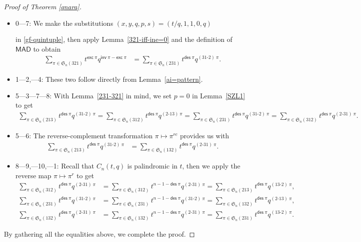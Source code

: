 \documentclass[12pt,reqno]{amsart}
\numberwithin{equation}{section}
\theoremstyle{plain}
\theoremstyle{definition}
\def\S{\mathfrak{S}}
\def\exc{\mathsf{exc}}
\def\des{\mathsf{des}}
\def\inv{\mathsf{inv}}
\def\MAD{\mathsf{MAD}}
\def\cab{31\text{-}2}
\def\bca{2\text{-}31}
\def\acb{13\text{-}2}
\def\bac{2\text{-}13}
\begin{document}
\begin{proof}[Proof of Theorem \ref{qnara}]
$\phantom{t}$
\begin{itemize}

	\item 0---7: We make the substitutions $(x,y,q,p,s)=(t/q,1,1,0,q)$

in \eqref{gf-quintuple}, then apply Lemma~\ref{321-iff-ine=0} and the definition of $\MAD$ to obtain
\begin{align*}
\sum_{\pi\in\S_n(321)}t^{\exc\:\pi}q^{\inv\:\pi-\exc\:\pi}
&=\sum_{\pi\in\S_n(231)}t^{\des\:\pi}q^{(\cab)\:\pi}.
\end{align*}
    \item 1---2,---4: These two follow directly from Lemma~\ref{ai=pattern}.
    \item 5---3---7---8:
With Lemma~\ref{231-321} in mind, we set $p=0$ in Lemma~\ref{SZL1} to get
\begin{align*}
\sum_{\pi\in\S_n(213)}t^{\des\:\pi}q^{(\cab)\:\pi}
=\sum_{\pi\in\S_n(312)}t^{\des\:\pi}q^{(\bac)\:\pi}
=\sum_{\pi\in\S_n(231)}t^{\des\:\pi}q^{(\cab)\:\pi}
=\sum_{\pi\in\S_n(312)}t^{\des\:\pi}q^{(\bca)\:\pi}.
\end{align*}
    \item 5---6: The reverse-complement transformation $\pi\mapsto\pi^{rc}$ provides us with
\begin{align*}
\sum_{\pi\in\S_n(213)}t^{\des\:\pi}q^{(\cab)\:\pi}
&=\sum_{\pi\in\S_n(132)}t^{\des\:\pi}q^{(\bca)\:\pi}.
\end{align*}
    \item 8---9,---10,---1: Recall that $C_n(t,q)$ is palindromic in $t$, then we apply the reverse map $\pi\mapsto\pi^r$ to get
\begin{align*}
\sum_{\pi\in\S_n(312)}t^{\des\:\pi}q^{(\bca)\:\pi}
&=\sum_{\pi\in\S_n(312)}t^{n-1-\des\:\pi}q^{(\bca)\:\pi}=\sum_{\pi\in\S_n(213)}t^{\des\:\pi}q^{(\acb)\:\pi},\\
\sum_{\pi\in\S_n(231)}t^{\des\:\pi}q^{(\cab)\:\pi}
&=\sum_{\pi\in\S_n(231)}t^{n-1-\des\:\pi}q^{(\cab)\:\pi}=\sum_{\pi\in\S_n(132)}t^{\des\:\pi}q^{(\bac)\:\pi},\\
\sum_{\pi\in\S_n(132)}t^{\des\:\pi}q^{(\bca)\:\pi}&=\sum_{\pi\in\S_n(132)}t^{n-1-\des\:\pi}q^{(\bca)\:\pi}=\sum_{\pi\in\S_n(231)}t^{\des\:\pi}q^{(\acb)\:\pi}.
\end{align*}
\end{itemize}
By gathering all the equalities above, we complete the proof.
\end{proof}
\end{document}
